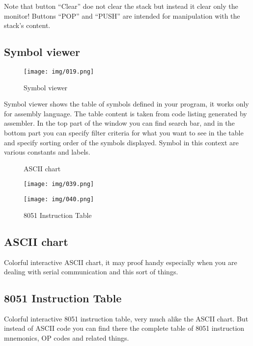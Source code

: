 \documentclass[a4paper,twoside,12pt]{book}
\begin{document}
			Note that button ``Clear'' doe not clear the stack but instead it clear only the monitor! Buttons ``POP'' and ``PUSH'' are intended for manipulation with the stack's content.

		\subsection{Symbol viewer}
			\begin{wrapfigure}{l}{160pt}
				\centering{}
				\texttt{[image: img/019.png]}
				\caption{Symbol viewer}
			\end{wrapfigure}
			Symbol viewer shows the table of symbols defined in your program, it works only for assembly language. The table content is taken from code listing generated by assembler. In the top part of the window you can find search bar, and in the bottom part you can specify filter criteria for what you want to see in the table and specify sorting order of the symbols displayed. Symbol in this context are various constants and labels.

		\begin{figure}[h!]
			\begin{minipage}[t]{.5\textwidth}
				\centering{}
				\caption{ASCII chart}
				\texttt{[image: img/039.png]}
			\end{minipage}
			\begin{minipage}[t]{.5\textwidth}
				\centering{}
				\caption{8051 Instruction Table}
				\texttt{[image: img/040.png]}
			\end{minipage}
		\end{figure}

		\clearpage
		\subsection{ASCII chart}
			Colorful interactive ASCII chart, it may proof handy especially when you are dealing with serial communication and this sort of things.

		\subsection{8051 Instruction Table}
			Colorful interactive 8051 instruction table, very much alike the ASCII chart. But instead of ASCII code you can find there the complete table of 8051 instruction mnemonics, OP codes and related things.
\end{document}
